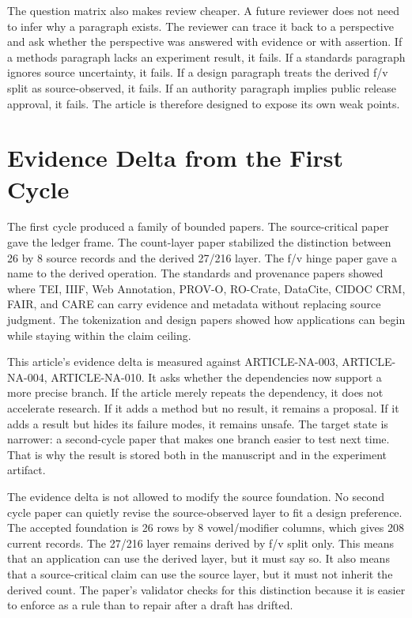 \documentclass[sigconf,nonacm]{acmart}
\begin{document}
The question matrix also makes review cheaper. A future reviewer does not need
to infer why a paragraph exists. The reviewer can trace it back to a perspective
and ask whether the perspective was answered with evidence or with assertion.
If a methods paragraph lacks an experiment result, it fails. If a standards
paragraph ignores source uncertainty, it fails. If a design paragraph treats the
derived f/v split as source-observed, it fails. If an authority paragraph implies
public release approval, it fails. The article is therefore designed to expose
its own weak points.

\section{Evidence Delta from the First Cycle}
The first cycle produced a family of bounded papers. The source-critical paper
gave the ledger frame. The count-layer paper stabilized the distinction between
26 by 8 source records and the derived 27/216 layer. The f/v hinge paper gave a
name to the derived operation. The standards and provenance papers showed where
TEI, IIIF, Web Annotation, PROV-O, RO-Crate, DataCite, CIDOC CRM, FAIR, and CARE
can carry evidence and metadata without replacing source judgment. The
tokenization and design papers showed how applications can begin while staying
within the claim ceiling.

This article's evidence delta is measured against ARTICLE-NA-003, ARTICLE-NA-004, ARTICLE-NA-010. It asks whether the
dependencies now support a more precise branch. If the article merely repeats
the dependency, it does not accelerate research. If it adds a method but no
result, it remains a proposal. If it adds a result but hides its failure modes,
it remains unsafe. The target state is narrower: a second-cycle paper that makes
one branch easier to test next time. That is why the result is stored both in
the manuscript and in the experiment artifact.

The evidence delta is not allowed to modify the source foundation. No second
cycle paper can quietly revise the source-observed layer to fit a design
preference. The accepted foundation is 26 rows by 8 vowel/modifier columns,
which gives 208 current records. The 27/216 layer remains derived by f/v split
only. This means that an application can use the derived layer, but it must say
so. It also means that a source-critical claim can use the source layer, but it
must not inherit the derived count. The paper's validator checks for this
distinction because it is easier to enforce as a rule than to repair after a
draft has drifted.
\end{document}
